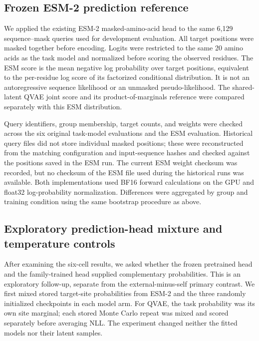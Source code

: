 \documentclass[referee,pdflatex,sn-vancouver-num]{sn-jnl}
\begin{document}
\subsection{Frozen ESM-2 prediction reference}
We applied the existing ESM-2 masked-amino-acid head to the same 6,129 sequence--mask queries used for development evaluation. All target positions were masked together before encoding. Logits were restricted to the same 20 amino acids as the task model and normalized before scoring the observed residues. The ESM score is the mean negative log probability over target positions, equivalent to the per-residue log score of its factorized conditional distribution. It is not an autoregressive sequence likelihood or an unmasked pseudo-likelihood. The shared-latent QVAE joint score and its product-of-marginals reference were compared separately with this ESM distribution.

Query identifiers, group membership, target counts, and weights were checked across the six original task-model evaluations and the ESM evaluation. Historical query files did not store individual masked positions; these were reconstructed from the matching configuration and input-sequence hashes and checked against the positions saved in the ESM run. The current ESM weight checksum was recorded, but no checksum of the ESM file used during the historical runs was available. Both implementations used BF16 forward calculations on the GPU and float32 log-probability normalization. Differences were aggregated by group and training condition using the same bootstrap procedure as above.

\subsection{Exploratory prediction-head mixture and temperature controls}
After examining the six-cell results, we asked whether the frozen pretrained head and the family-trained head supplied complementary probabilities. This is an exploratory follow-up, separate from the external-minus-self primary contrast. We first mixed stored target-site probabilities from ESM-2 and the three randomly initialized checkpoints in each model arm. For QVAE, the task probability was its own site marginal; each stored Monte Carlo repeat was mixed and scored separately before averaging NLL. The experiment changed neither the fitted models nor their latent samples.
\end{document}
